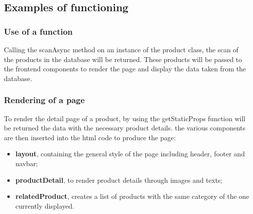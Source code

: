 \subsection{Examples of functioning}
\subsubsection{Use of a function}
Calling the scanAsync method on an instance of the product class, the scan of the products in the database will be returned. These products will be passed to the frontend components to render the page and display the data taken from the database.
\subsubsection{Rendering of a page}
To render the detail page of a product, by using the getStaticProps function will be returned the data with the necessary product details. the various components are then inserted into the html code to produce the page:
\begin{itemize}
  \item \textbf{layout}, containing the general style of the page including header, footer and navbar;
  \item \textbf{productDetail}, to render product details through images and texts;
  \item \textbf{relatedProduct}, creates a list of products with the same category of the one currently displayed.
\end{itemize}